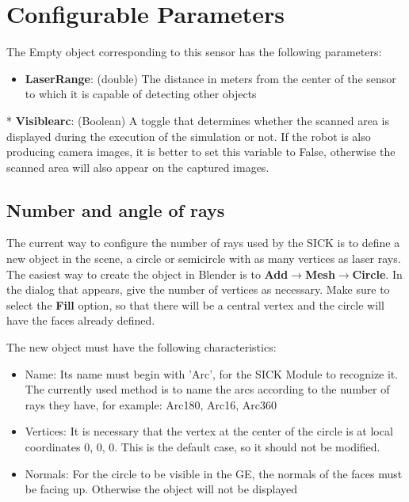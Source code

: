 \documentclass[twoside,a4paper,10pt]{report}
\newcommand{\dokutitleleveltwo}[1]{\section{#1}}
\newcommand{\dokutitleleveltree}[1]{\subsection{#1}}
\newcommand{\dokubold}[1]{\textbf{#1}}
\newcommand{\dokuitem}{\item}
\begin{document}
\dokutitleleveltwo{Configurable Parameters}
\label{576be46e2988ecd45f7341398c2cb015}%

The Empty object corresponding to this sensor has the following parameters:


\begin{itemize}
\dokuitem  \dokubold{Laser{\textunderscore}Range}: (double) The distance in meters from the center of the sensor to which it is capable of detecting other objects
\end{itemize}

  * \dokubold{Visible{\textunderscore}arc}: (Boolean) A toggle that determines whether the scanned area is displayed during the execution of the simulation or not. If the robot is also producing camera images, it is better to set this variable to False, otherwise the scanned area will also appear on the captured images.


\dokutitleleveltree{Number and angle of rays}
\label{0e26d09474e479fcb039d350438a39b6}%

The current way to configure the number of rays used by the SICK is to define a new object in the scene, a circle or semicircle with as many vertices as laser rays.
The easiest way to create the object in Blender is to \dokubold{Add{$\rightarrow$}Mesh{$\rightarrow$}Circle}. In the dialog that appears, give the number of vertices as necessary. Make sure to select the \dokubold{Fill} option, so that there will be a central vertex and the circle will have the faces already defined.

The new object must have the following characteristics:



\begin{itemize}
\dokuitem  Name: Its name must begin with 'Arc{\textunderscore}', for the SICK Module to recognize it. The currently used method is to name the arcs according to the number of rays they have, for example: Arc{\textunderscore}180, Arc{\textunderscore}16, Arc{\textunderscore}360
\end{itemize}

\begin{itemize}
\dokuitem  Vertices: It is necessary that the vertex at the center of the circle is at local coordinates 0, 0, 0. This is the default case, so it should not be modified.
\end{itemize}

\begin{itemize}
\dokuitem  Normals: For the circle to be visible in the GE, the normals of the faces must be facing up. Otherwise the object will not be displayed
\end{itemize}
\end{document}
